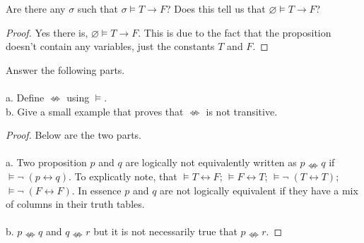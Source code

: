 \documentclass[12pt]{article}
\newenvironment{exercise}[2][Exercise]{\begin{trivlist}
\item[\hskip \labelsep {\bfseries #1}\hskip \labelsep {\bfseries #2.}]}{\end{trivlist}}
\begin{document}
\begin{exercise}{21}
Are there any $\sigma$ such that $\sigma \models T \rightarrow F$? Does this tell us that $\varnothing \models T \rightarrow F$?
\end{exercise}

\begin{proof}
Yes there is, $\varnothing \models T \rightarrow F$. This is due to the fact that the proposition doesn't contain any variables, just the constants $T$ and $F$. 

\end{proof}

\begin{exercise}{22}
Answer the following parts. \\ \\
a. Define $\nLeftrightarrow$ using $\models$. \\ 
b. Give a small example that proves that $\nLeftrightarrow$ is not transitive. 
\end{exercise}

\begin{proof}
Below are the two parts. \\ \\
a. Two proposition $p$ and $q$ are logically not equivalently written as $p \nLeftrightarrow q$ if $\models \neg\; (p \leftrightarrow q)$. To explicatly note, that $\models T \leftrightarrow F$; $\models F \leftrightarrow T$; $\models \neg\; (T \leftrightarrow T)$; $\models \neg\; (F \leftrightarrow F)$. In essence $p$ and $q$ are not logically equivalent if they have a mix of columns in their truth tables. \\ \\
b. $p \nLeftrightarrow q$ and $q \nLeftrightarrow r$ but it is not necessarily true that $p \nLeftrightarrow r$.

\end{proof}
\end{document}
